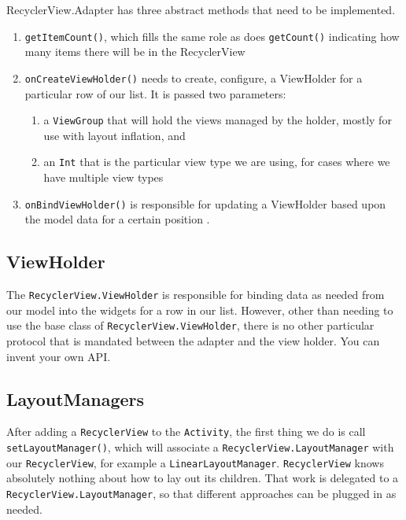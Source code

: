 RecyclerView.Adapter has three abstract methods that need to be implemented.

\begin{enumerate}
	\item \lstinline!getItemCount()!, which fills the same role as does \lstinline!getCount()! indicating how many items there will be in the RecyclerView
	\item \lstinline!onCreateViewHolder()!  needs to create, configure,	a ViewHolder for a particular row of our list.
	It is passed two parameters:
	\begin{enumerate}
		\item a \lstinline!ViewGroup! that will hold the views managed by the holder, mostly for use
		with layout inflation, and
		\item an \lstinline!Int! that is the particular view type we are using, for cases where we have
		multiple view types
	\end{enumerate}
	\item \lstinline!onBindViewHolder()!
	is responsible for updating a ViewHolder based upon the
	model data for a certain position .
\end{enumerate}




\subsection{ViewHolder}
The \lstinline!RecyclerView.ViewHolder! is responsible for binding data as needed from our model into the widgets for a row in our list.
However, other than needing to use the base class of \lstinline!RecyclerView.ViewHolder!, there is no other particular protocol that is mandated between the adapter and the view holder.
You can invent your own API.




\subsection{LayoutManagers}
After adding a \lstinline!RecyclerView! to the \lstinline!Activity!, the first thing we do is call \lstinline!setLayoutManager()!,
which will associate a \lstinline!RecyclerView.LayoutManager! with our \lstinline!RecyclerView!, for example a \lstinline!LinearLayoutManager!.
\lstinline!RecyclerView! knows absolutely nothing about how to lay out its children.
That work is delegated to a \lstinline!RecyclerView.LayoutManager!, so that different approaches can be plugged in as needed.

